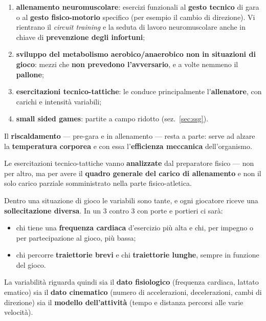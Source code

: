 \begin{enumerate}
  \item \textbf{allenamento neuromuscolare}: esercizi funzionali al \textbf{gesto tecnico} di gara o
    al \textbf{gesto fisico-motorio} specifico (per esempio il cambio di direzione). Vi rientrano il
    \textit{circuit training} e la seduta di lavoro neuromuscolare anche in chiave di
    \textbf{prevenzione degli infortuni};
  \item \textbf{sviluppo del metabolismo aerobico/anaerobico non in situazioni di gioco}: mezzi che
    \textbf{non prevedono l'avversario}, e a volte nemmeno il \textbf{pallone};
  \item \textbf{esercitazioni tecnico-tattiche}: le conduce principalmente l'\textbf{allenatore}, con
    carichi e intensità variabili;
  \item \textbf{small sided games}: partite a campo ridotto (sez.~\ref{sec:ssg}).
\end{enumerate}

Il \textbf{riscaldamento} --- pre-gara e in allenamento --- resta a parte: serve ad alzare la
\textbf{temperatura corporea} e con essa l'\textbf{efficienza meccanica} dell'organismo.

Le esercitazioni tecnico-tattiche vanno \textbf{analizzate} dal preparatore fisico --- non per
altro, ma per avere il \textbf{quadro generale del carico di allenamento} e non il solo carico
parziale somministrato nella parte fisico-atletica.

Dentro una situazione di gioco le variabili sono tante, e ogni giocatore riceve una
\textbf{sollecitazione diversa}. In un 3 contro 3 con porte e portieri ci sarà:

\begin{itemize}
  \item chi tiene una \textbf{frequenza cardiaca} d'esercizio più alta e chi, per impegno o per
    partecipazione al gioco, più bassa;
  \item chi percorre \textbf{traiettorie brevi} e chi \textbf{traiettorie lunghe}, sempre in
    funzione del gioco.
\end{itemize}

La variabilità riguarda quindi sia il \textbf{dato fisiologico} (frequenza cardiaca, lattato
ematico) sia il \textbf{dato cinematico} (numero di accelerazioni, decelerazioni, cambi di
direzione) sia il \textbf{modello dell'attività} (tempo e distanza percorsi alle varie velocità).

